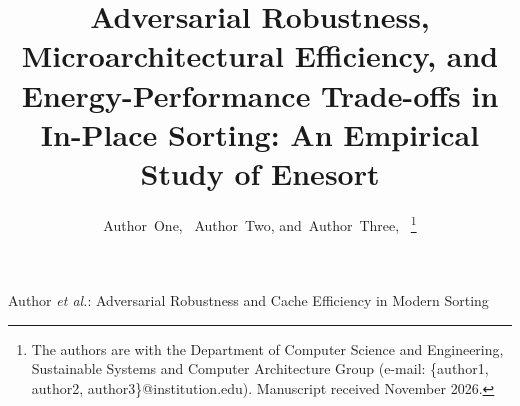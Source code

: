 \documentclass[journal]{IEEEtran}
\begin{document}
\title{Adversarial Robustness, Microarchitectural Efficiency, and Energy-Performance Trade-offs in In-Place Sorting: An Empirical Study of Enesort}

\author{Author~One,~
        Author~Two,
        and~Author~Three,~%
\thanks{The authors are with the Department of Computer Science and Engineering, Sustainable Systems and Computer Architecture Group (e-mail: \{author1, author2, author3\}@institution.edu). Manuscript received November 2026.}}

%
{Author \MakeLowercase{\textit{et al.}}: Adversarial Robustness and Cache Efficiency in Modern Sorting}

\maketitle
\end{document}
